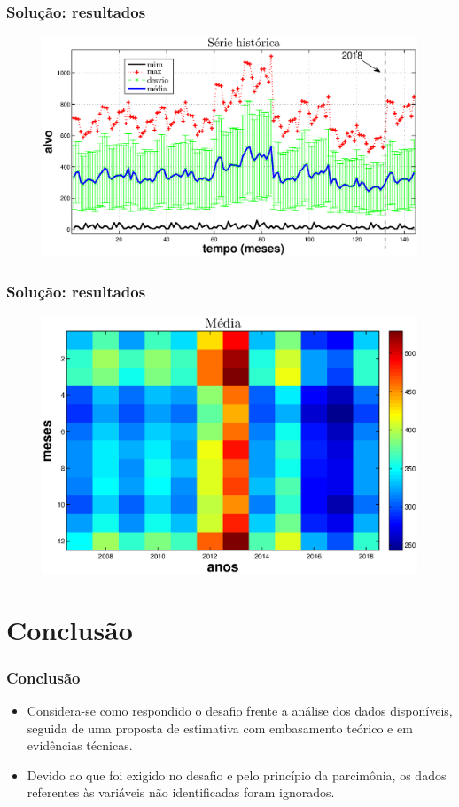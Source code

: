 \documentclass[xcolor=dvipsnames,xcolor=table]{beamer}
\begin{document}
\begin{frame}\frametitle{Solução: resultados}
\begin{figure}[htpb] \begin{center} 
\includegraphics[width=0.9\columnwidth]{prev2}
\end{center}
\end{figure}
\end{frame}


\begin{frame}\frametitle{Solução: resultados}
\begin{figure}[htpb] \begin{center} 
\includegraphics[width=0.9\columnwidth]{prev3}
\end{center}
\end{figure}
\end{frame}


\section{Conclusão}
\begin{frame}\frametitle{Conclusão}

\begin{itemize}
\item Considera-se como respondido o desafio frente a análise dos dados disponíveis, seguida de uma proposta de estimativa com embasamento teórico e em evidências técnicas.
\item Devido ao que foi exigido no desafio e pelo princípio da parcimônia, os dados referentes às variáveis não identificadas foram ignorados.
\end{itemize}

\end{frame}
\end{document}
